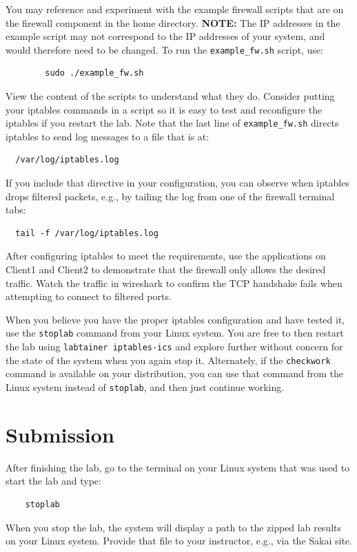 You may reference and experiment with the example firewall scripts that
are on the firewall component in the home directory.  \textbf{NOTE:} The IP addresses in the example
script may not correspond to the IP addresses of your system, and would
therefore need to be changed.  To run the {\tt example\_fw.sh} script, use:
\begin{verbatim}
        sudo ./example_fw.sh
\end{verbatim}
View the content of the scripts to understand what they do.
Consider putting your iptables commands in a script so it is easy
to test and reconfigure the iptables if you restart the lab.
Note that the last line of {\tt example\_fw.sh} directs iptables
to send log messages to a file that is at:
\begin{verbatim}
  /var/log/iptables.log
\end{verbatim}
\noindent If you include that directive in your configuration, you can observe when
iptables drops filtered packets, e.g., by tailing the log from one of the 
firewall terminal tabs:
\begin{verbatim}
  tail -f /var/log/iptables.log
\end{verbatim}

After configuring iptables to meet the requirements, use the applications on Client1 and Client2 to
demonstrate that the firewall only allows the desired traffic.
Watch the traffic in wireshark to confirm the TCP handshake fails
when attempting to connect to filtered ports.  

When you believe you have the proper iptables configuration and have tested it,
use the {\tt stoplab} command from your Linux system.  You are free to then restart
the lab using {\tt labtainer iptables-ics} and explore further without concern for
the state of the system when you again stop it.  Alternately, if the {\tt checkwork} command is
available on your distribution, you can use that command from the Linux system instead of {\tt stoplab}, and then just
continue working.

\section{Submission}
After finishing the lab, go to the terminal on your Linux system that was used to start the lab and type:
\begin{verbatim}
    stoplab 
\end{verbatim}
When you stop the lab, the system will display a path to the zipped lab results on your Linux system.  Provide that file to 
your instructor, e.g., via the Sakai site.

\copyrightnotice


